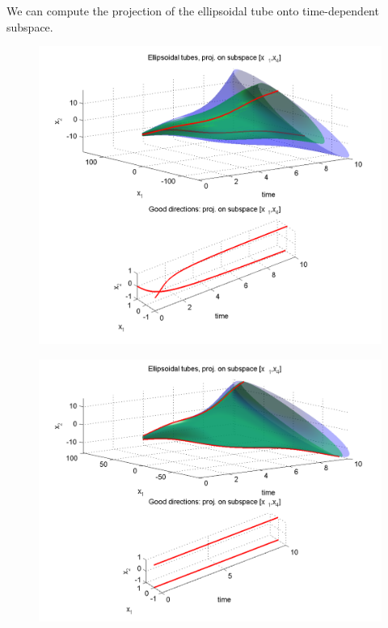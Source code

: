 \documentclass[letterpaper,10pt,english]{sphinxmanual}
\begin{document}
We can compute the projection of the ellipsoidal
tube onto time-dependent subspace.
\begin{figure}[htbp]
\centering

\includegraphics{reachTubeStatProj.png}
\label{chap_implement:stat-proj}\end{figure}
\begin{figure}[htbp]
\centering

\includegraphics{reachTubeDynProj.png}
\label{chap_implement:dyn-proj}\end{figure}
\end{document}
